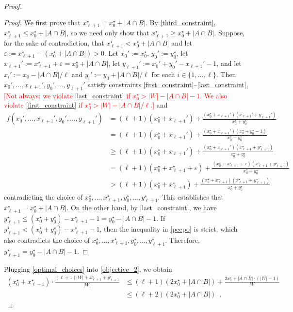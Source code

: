 \documentclass{patmorin}
\begin{document}
\begin{proof}
  \begin{proof}
    We first prove that $x_{\ell+1}^\star = x_0^\star+|A\cap B|$.
    By \eqref{third_constraint}, $x_{\ell+1}^\star\le x_0^\star+|A\cap B|$, so we need only show that $x_{\ell+1}^\star\ge x_0^\star+|A\cap B|$.
    Suppose, for the sake of contradiction, that $x_{\ell+1}^\star<x_0^\star+|A\cap B|$ and let $\varepsilon := x_{\ell+1}^\star - (x_0^\star+|A\cap B|) >0$.  Let $x_0':=x_0^\star$, $y_0':=y_0^\star$, let $x_{\ell+1}':= x_{\ell+1}^\star + \varepsilon = x_0^\star+|A\cap B|$, let $y_{\ell+1}':=x_0'+y_0'-x_{\ell+1}'-1$, and let $x_i':=x_0-|A\cap B|/\ell$ and $y_i':=y_0+|A\cap B|/\ell$ for each $i\in\{1,\ldots,\ell\}$.  Then $x_0',\ldots,x_{\ell+1}',y_0',\ldots,y_{\ell+1}'$ satisfy constraints \eqref{first_constraint}--\eqref{last_constraint}, \textcolor{red}{[Not always: we violate \eqref{last_constraint} if $x_0^\star > |W|-|A\cap B|-1$. We also violate \eqref{first_constraint} if $x_0^\star > |W|-|A\cap B|/\ell$.]} and
    \begin{align}
      f(x_0',\ldots,x_{\ell+1}',y_0',\ldots,y_{\ell+1}')
      & =
      (\ell+1)(x_0^\star+x_{\ell+1}')+\frac{(x_0^\star+x_{\ell+1}')(x_{\ell+1}'+y_{\ell+1}')}{x_0^\star+y_0^\star} \\
      & =
      (\ell+1)(x_0^\star+x_{\ell+1}')+\frac{(x_0^\star+x_{\ell+1}')(x_0^\star+y_0^\star-1)}{x_0^\star+y_0^\star}  \\
      & \ge
      (\ell+1)(x_0^\star+x_{\ell+1}')+\frac{(x_0^\star+x_{\ell+1}')(x_{\ell+1}^\star+y_{\ell+1}^\star)}{x_0^\star+y_0^\star} \label{peepo} \\
      & =
      (\ell+1)(x_0^\star+x_{\ell+1}^\star+\varepsilon)+\frac{(x_0^\star+x_{\ell+1}^\star+\varepsilon)(x_{\ell+1}^\star+y_{\ell+1}^\star)}{x_0^\star+y_0^\star} \\
      & >
      (\ell+1)(x_0^\star+x_{\ell+1}^\star)+\frac{(x_0^\star+x_{\ell+1}^\star)(x_{\ell+1}^\star+y_{\ell+1}^\star)}{x_0^\star+y_0^\star}  \label{tempo}
    \end{align}
    contradicting the choice of $x_0^\star,\ldots,x_{\ell+1}^\star,y_0^\star,\ldots,y_{\ell+1}^\star$.  This establishes that $x^\star_{\ell+1}=x^\star_0+|A\cap B|$. On the other hand, by \eqref{last_constraint}, we have $y_{\ell+1}^\star \le (x_0^\star+y_0^\star) -x_{\ell+1}^\star-1=y_0^\star-|A\cap B|-1$. If $y_{\ell+1}^\star < (x_0^\star+y_0^\star) -x_{\ell+1}^\star-1$, then the inequality in \eqref{peepo} is strict, which also contradicts the choice of $x_0^\star,\ldots,x_{\ell+1}^\star,y_0^\star,\ldots,y_{\ell+1}^\star$.  Therefore, $y_{\ell+1}^\star=y_0^\star-|A\cap B|-1$.
  \end{proof}
  Plugging \cref{optimal_choices} into \eqref{objective_2}, we obtain
  \begin{align*}
    (x_0^\star+x_{\ell+1}^\star)\cdot\frac{(\ell+1)|W|+x_{\ell+1}^\star+y_{\ell+1}^\star}{|W|}
    & \le (\ell+1)(2x_0^\star + |A\cap B|) + \frac{2x_0^\star+|A\cap B|\cdot(|W|-1)}{W} \\
    & \le (\ell+2)(2x_0^\star + |A\cap B|) \enspace .
  \end{align*}


\end{proof}
\end{document}
